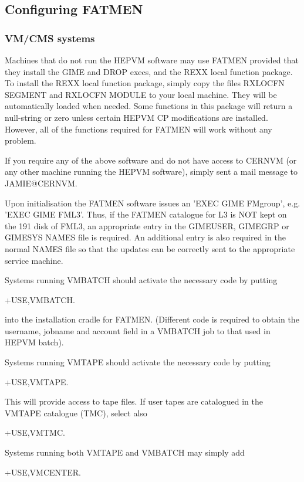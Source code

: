 \subsection{Configuring FATMEN}
\subsubsection{VM/CMS systems}
\par
Machines that do not run the HEPVM software may use FATMEN
provided that they install the GIME and DROP execs, and
the REXX local function package. To install the REXX local
function package, simply copy the files RXLOCFN SEGMENT and
RXLOCFN MODULE to your local machine. They will be
automatically loaded when needed. Some functions
in this package will return a null-string or zero unless
certain HEPVM CP modifications are installed. However, all of the
functions required for FATMEN will work without any problem.
\par
If you require any of the above software and do not have
access to CERNVM (or any other machine running the HEPVM
software), simply sent a mail message to JAMIE@CERNVM. 
\par
Upon initialisation the FATMEN software issues an 'EXEC GIME FMgroup',
e.g. 'EXEC GIME FML3'. Thus, if the FATMEN catalogue for L3 is NOT
kept on the 191 disk of FML3, an appropriate
entry in the GIMEUSER, GIMEGRP or GIMESYS NAMES file is required.
An additional entry is also required in the normal NAMES file
so that the updates can be correctly sent to the appropriate service
machine.
\par
Systems running VMBATCH should activate the necessary code by
putting
\begin{XMP}
+USE,VMBATCH.
\end{XMP}
into the installation cradle for FATMEN. 
(Different code is required to obtain the username, jobname
and account field in a VMBATCH job to that used in HEPVM batch).
\par
Systems running VMTAPE should activate the necessary code by putting
\begin{XMP}
+USE,VMTAPE.
\end{XMP}
This will provide access to tape files.
If user tapes are catalogued in the VMTAPE catalogue (TMC),
select also
\begin{XMP}
+USE,VMTMC.
\end{XMP}
\par
Systems running both VMTAPE and VMBATCH may simply add
\begin{XMP}
+USE,VMCENTER.
\end{XMP}
